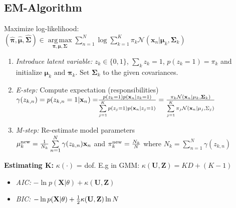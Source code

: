 \documentclass[a4paper,11pt]{article}
\newcommand{\argmax}{\operatorname*{arg\,max}}
\begin{document}
\begin{multicols}{2}
\subsection{EM-Algorithm}
Maximize log-likelihood:
$(\mathbf{\hat \pi}, \mathbf{\hat \mu }, \mathbf{\hat \Sigma}) \in \argmax\limits_{\mathbf \pi, \mathbf \mu, \mathbf \Sigma} \sum\limits_{n=1}^N \log \sum\limits_{k=1}^K  \pi_k \mathcal N (\mathbf x_n | \mathbf \mu_k, \mathbf \Sigma_k)$
\begin{enumerate}[leftmargin=0.4cm]
  \itemsep0em 
  \item \emph{Introduce latent variable:} $z_{k} \in \{0, 1\}$,  $\sum\limits_k z_k = 1$, $p(z_k=1) = \pi_k$ and initialize $\mathbf \mu_k \text{ and }\mathbf \pi_k \text{. Set }\mathbf \Sigma_k$ to the given covariances.
  \item \emph{E-step:} Compute expectation (responsibilities)\\
  ${ {\small \gamma(z_{k,n}) = p(z_{k,n} = 1 | \mathbf{x}_n) =} \frac{p(z_k = 1) p(\mathbf{x}_n | z_k = 1)}{\sum\limits_{j=1}^K 
  p(z_j = 1) p(\mathbf{x}_n | z_j = 1)} = 
  {\pi_k \mathcal N(\mathbf x_n | \mathbf \mu_k, \mathbf \Sigma_k) \over \sum\limits_{j=1}^K \pi_j \mathcal N(\mathbf x_n | \mathbf \mu_j, \Sigma_j)}}$
  \item \emph{M-step:} Re-estimate model parameters\\
  $\mathbf \mu_k^\text{new} = {1\over N_k} \sum\limits_{n=1}^N \gamma(z_{k,n})\mathbf x_n$ and 
  $\pi_k^{\text{new}} = {N_k\over N}$ where $N_k = \sum\limits_{n=1}^N \gamma(z_{k,n})$
\end{enumerate}
\textbf{Estimating K:} $\kappa(\cdot)$ = dof. E.g in GMM: $\kappa(\mathbf{U}, \mathbf{Z}) = K D + (K-1)$
\begin{itemize}[leftmargin=0.5cm]
  \itemsep0em 
  \item \emph{AIC:} $- \ln p(\textbf{X} | \theta) + \kappa(\mathbf{U}, \mathbf{Z})$
  \item \emph{BIC:} $- \ln p(\textbf{X} | \theta) + {1 \over 2} \kappa(\mathbf{U}, \mathbf{Z}) \ln N$
\end{itemize}



\end{multicols}
\end{document}
